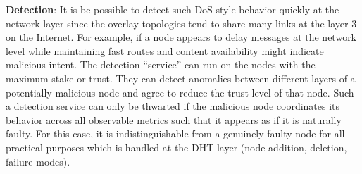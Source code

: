 \textbf{Detection}: It is be possible to detect such DoS style behavior quickly at the network layer since the overlay topologies tend to share many links at the layer-3 on the Internet. For example, if a node appears to delay messages at the network level while maintaining fast routes and content availability might indicate malicious intent. The detection “service” can run on the nodes with the maximum stake or trust. They can detect anomalies between different layers of a potentially malicious node and agree to reduce the trust level of that node. Such a detection service can only be thwarted if the malicious node coordinates its behavior across all observable metrics such that it appears as if it is naturally faulty. For this case, it is indistinguishable from a genuinely faulty node for all practical purposes which is handled at the DHT layer (node addition, deletion, failure modes).

